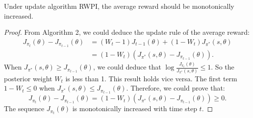 \begin{lemma}
Under update algorithm RWPI, the average reward should be monotonically increased.
\begin{proof}
From Algorithm 2, we could deduce the update rule of the average reward:
\begin{equation}
\begin{aligned}
J_{\pi_{t}}(\theta) - J_{\pi_{t-1}}(\theta) &= (W_{t}-1)J_{t-1}(\theta) + (1-W_{t})J_{\pi^{*}}(s,\theta)\\
&= (1-W_{t})(J_{\pi^{*}}(s,\theta)-J_{\pi_{t-1}}(\theta)).
\end{aligned}
\end{equation}
When $J_{\pi^{*}}(s,\theta) \geq J_{\pi_{t-1}}(\theta)$, we could deduce that $\log\frac{J_{\pi_{t}}(\theta)}{J_{\pi^{*}}(s,\theta)} \leq 1$. So the posterior weight $W_{t}$ is less than 1. This result holds vice versa. The first term $1-W_{t} \leq 0$ when $J_{\pi^{*}}(s,\theta) \leq J_{\pi_{t-1}}(\theta)$. Therefore, we could prove that:
\begin{equation}
J_{\pi_{t}}(\theta) - J_{\pi_{t-1}}(\theta) = (1-W_{t})(J_{\pi^{*}}(s,\theta)-J_{\pi_{t-1}}(\theta)) \geq 0.
\end{equation}
The sequence $J_{\pi_{t}}(\theta)$ is monotonically increased with time step $t$.
\end{proof}
\end{lemma}



